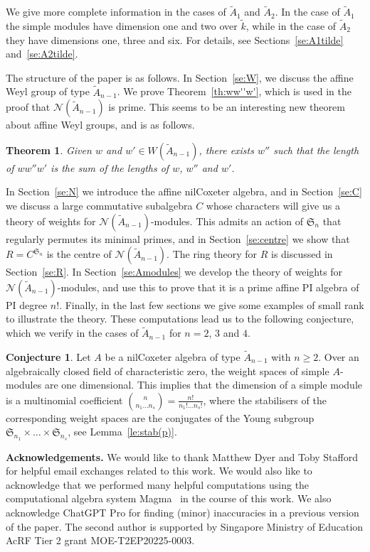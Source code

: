 \documentclass[12pt]{amsart}
\renewcommand{\ge}{\geqslant}
\newcommand{\sym}[1]{\mathfrak{S}_{#1}}
\newcommand{\mcN}{\mathcal{N}}
\numberwithin{equation}{section}
\newtheorem{theorem}[equation]{Theorem}
\theoremstyle{definition}
\newtheorem{conjecture}[equation]{Conjecture}
\begin{document}
We give more complete information in the cases of $\tilde A_1$ and
$\tilde A_2$. In the case of $\tilde A_1$ the simple modules have
dimension one and two over $\tilde k$, while in the case of $\tilde
A_2$ they have dimensions one, three and six. For details, see
Sections~\ref{se:A1tilde} and~\ref{se:A2tilde}.\bigskip

The structure of the paper is as follows. In Section~\ref{se:W}, we
discuss the affine Weyl group of type $\tilde A_{n-1}$. We prove 
Theorem~\ref{th:ww''w'},
which is used in the proof that $\mcN(\tilde
A_{n-1})$ is prime. This seems to be an interesting new theorem about
affine Weyl groups, and is as follows.

\begin{theorem}
Given $w$ and $w'\in W(\tilde A_{n-1})$, there exists $w''$ such that
the length of $ww''w'$ is the sum of the lengths of $w$, $w''$ and $w'$.
\end{theorem}

In Section~\ref{se:N} we introduce the affine nilCoxeter algebra, and
in Section~\ref{se:C} we discuss a large commutative subalgebra $C$
whose characters will give us a theory of weights for $\mcN(\tilde
A_{n-1})$-modules. This admits an action of $\sym{n}$ that regularly
permutes its minimal primes, and in Section~\ref{se:centre} we show that
$R=C^{\sym{n}}$ is the centre of $\mcN(\tilde A_{n-1})$. The ring
theory for $R$ is discussed in Section~\ref{se:R}. In
Section~\ref{se:Amodules} we develop the theory of weights for
$\mcN(\tilde A_{n-1})$-modules, and use this to prove that it is a
prime affine PI algebra of PI degree $n!$. Finally, in the last few
sections we give some examples of small rank to illustrate the theory.
These computations lead us to the following conjecture,
which we verify in the cases of $\tilde A_{n-1}$ for $n=2$, $3$ and $4$.

\begin{conjecture}\label{conj:multinomial}
Let $A$ be a nilCoxeter algebra of type $\tilde A_{n-1}$ with $n\ge 2$. 
Over an algebraically closed
field of characteristic zero, the weight spaces of
simple $A$-modules are one dimensional. This implies that the
dimension of a simple module is a
multinomial coefficient 
$\binom{n}{n_1\dots n_s}=\frac{n!}{n_1!\dots n_s!}$, 
where the stabilisers of the 
corresponding weight spaces  are the conjugates of the Young subgroup
$\sym{n_1}\times\dots\times\sym{n_s}$, see Lemma~\ref{le:stab(p)}.
\end{conjecture}


\noindent
{\bf Acknowledgements.} We would like to thank Matthew Dyer and Toby
Stafford for helpful email exchanges related to this work. We would
also like to acknowledge that we performed many helpful computations using the
computational algebra system {\sc Magma}~\cite{Bosma/Cannon/Playoust:1997a}
in the course of this work. We also acknowledge ChatGPT Pro for finding (minor) inaccuracies in a previous version of the paper. The second author is supported by Singapore Ministry of Education AcRF Tier 2 grant MOE-T2EP20225-0003.
\end{document}

